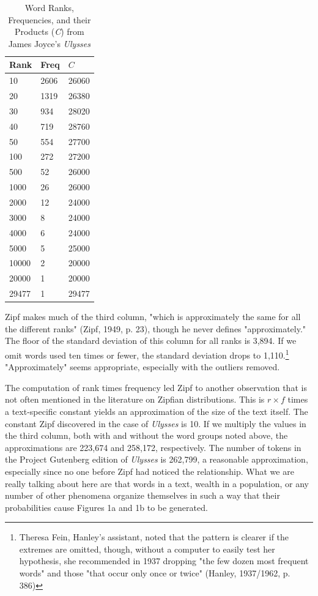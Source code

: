 \documentclass[12pt]{article}
\begin{document}
\begin{table}
\begin{center}
 \begin{tabular}{||l l l|| }
 \hline
 Rank &  Freq  & $C$ \\
 \hline
    10 & 2606& 26060    \\
    20 & 1319 & 26380   \\
    30 & 934 & 28020    \\
    40 & 719 & 28760    \\
    50 & 554 & 27700    \\
    100 & 272 & 27200   \\
    500 & 52 & 26000    \\
    1000 & 26 & 26000   \\
    2000 & 12 & 24000   \\
    3000 & 8 & 24000    \\
    4000 & 6 & 24000    \\
    5000 & 5 & 25000    \\
    10000 & 2 & 20000   \\
    20000 & 1 & 20000   \\
    29477 & 1 & 29477   \\
  \hline
\end{tabular} 
\caption{Word Ranks, Frequencies, and their Products (\emph{C}) from James Joyce's \emph{Ulysses}}
\end{center}
\end{table}
Zipf makes much of the third column, "which is approximately the same for all the different ranks" (Zipf, 1949, p. 23), though he never defines "approximately."  The floor of the standard deviation of this column for all ranks is 3,894.  If we omit words used ten times or fewer, the standard deviation drops to 1,110.\footnote[4]{Theresa Fein, Hanley's assistant, noted that the pattern is clearer if the extremes are omitted, though, without a computer to easily test her hypothesis, she recommended in 1937 dropping "the few dozen most frequent words" and those "that occur only once or twice" (Hanley, 1937/1962, p. 386)}  
"Approximately" seems appropriate, especially with the outliers removed. 

The computation of rank times frequency led Zipf to another observation that is not often mentioned in the literature on Zipfian distributions.  This is $r \times f$ times a text-specific constant yields an approximation of the size of the text itself. The constant Zipf discovered in the case of \emph{Ulysses} is 10.  If we multiply the values in the third column, both with and without the word groups noted above, the approximations are 223,674 and 258,172, respectively.   The number of tokens in the Project Gutenberg edition of \emph{Ulysses} is 262,799, a reasonable approximation, especially since no one before Zipf had noticed the relationship.   What we are really talking about here are that words in a text, wealth in a population, or any number of other phenomena organize themselves in such a way that their probabilities cause Figures 1a and 1b to be generated. 
\end{document}
